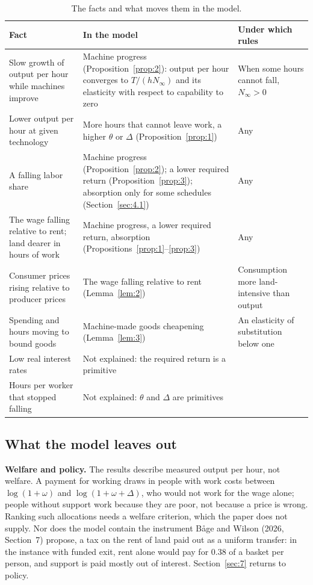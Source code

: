 \documentclass[12pt]{article}
\theoremstyle{plain}
\begin{document}
\begin{table}[htbp]
\centering
\caption{The facts and what moves them in the model.}
\label{tab:facts}
\footnotesize
\renewcommand{\arraystretch}{1.15}
\begin{tabular}{@{}>{\raggedright\arraybackslash}p{}>{\raggedright\arraybackslash}p{}>{\raggedright\arraybackslash}p{}@{}}
\toprule
Fact & In the model & Under which rules \\
\midrule
Slow growth of output per hour while machines improve & Machine progress (Proposition~\ref{prop:2}): output per hour converges to $T/(hN_\infty)$ and its elasticity with respect to capability to zero & When some hours cannot fall, $N_\infty>0$ \\
\addlinespace
Lower output per hour at given technology & More hours that cannot leave work, a higher $\theta$ or $\Delta$ (Proposition~\ref{prop:1}) & Any \\
\addlinespace
A falling labor share & Machine progress (Proposition~\ref{prop:2}); a lower required return (Proposition~\ref{prop:3}); absorption only for some schedules (Section~\ref{sec:4.1}) & Any \\
\addlinespace
The wage falling relative to rent; land dearer in hours of work & Machine progress, a lower required return, absorption (Propositions~\ref{prop:1}--\ref{prop:3}) & Any \\
\addlinespace
Consumer prices rising relative to producer prices & The wage falling relative to rent (Lemma~\ref{lem:2}) & Consumption more land-intensive than output \\
\addlinespace
Spending and hours moving to bound goods & Machine-made goods cheapening (Lemma~\ref{lem:3}) & An elasticity of substitution below one \\
\addlinespace
Low real interest rates & Not explained: the required return is a primitive & \\
\addlinespace
Hours per worker that stopped falling & Not explained: $\theta$ and $\Delta$ are primitives & \\
\bottomrule
\end{tabular}
\end{table}

\subsection{What the model leaves out}\label{sec:4.6}

\textbf{Welfare and policy.} The results describe measured output per hour, not welfare. A payment for working draws in people with work costs between $\log(1+\omega)$ and $\log(1+\omega+\Delta)$, who would not work for the wage alone; people without support work because they are poor, not because a price is wrong. Ranking such allocations needs a welfare criterion, which the paper does not supply. Nor does the model contain the instrument B\r{a}ge and Wilson (2026, Section~7) propose, a tax on the rent of land paid out as a uniform transfer: in the instance with funded exit, rent alone would pay for 0.38 of a basket per person, and support is paid mostly out of interest. Section~\ref{sec:7} returns to policy.
\end{document}
